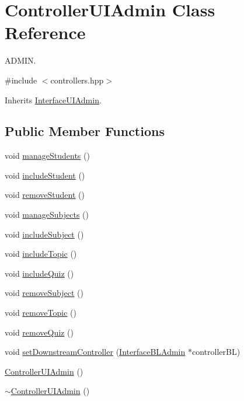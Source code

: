 \hypertarget{class_controller_u_i_admin}{}\section{Controller\+U\+I\+Admin Class Reference}
\label{class_controller_u_i_admin}


A\+D\+M\+IN.  




{\ttfamily \#include $<$controllers.\+hpp$>$}



Inherits \hyperlink{class_interface_u_i_admin}{Interface\+U\+I\+Admin}.

\subsection*{Public Member Functions}
\begin{DoxyCompactItemize}
\item 
void \hyperlink{class_controller_u_i_admin_ad77ca0f143bc938b48198d91b1be031b}{manage\+Students} ()
\item 
void \hyperlink{class_controller_u_i_admin_abe57cd3860f99ae9ee0023bdb9ccd6b1}{include\+Student} ()
\item 
void \hyperlink{class_controller_u_i_admin_a4487c7bf31acf5637e15e62af131b550}{remove\+Student} ()
\item 
void \hyperlink{class_controller_u_i_admin_a1e09e8b10c0f2261e307d9e9023daaa4}{manage\+Subjects} ()
\item 
void \hyperlink{class_controller_u_i_admin_a7c31484c26788da7ea3d551bbf9f82f8}{include\+Subject} ()
\item 
void \hyperlink{class_controller_u_i_admin_adb83b8e77cde718af7571e4d256b6b63}{include\+Topic} ()
\item 
void \hyperlink{class_controller_u_i_admin_a9867df3728ad7e8c663a3b999e96a441}{include\+Quiz} ()
\item 
void \hyperlink{class_controller_u_i_admin_a7799d896fb475d2731843c6a67db3390}{remove\+Subject} ()
\item 
void \hyperlink{class_controller_u_i_admin_aad9b0c9e945e3075bb8eb25b55378f27}{remove\+Topic} ()
\item 
void \hyperlink{class_controller_u_i_admin_aeb774e2a137c65593cbe4c3ed22ffe64}{remove\+Quiz} ()
\item 
void \hyperlink{class_controller_u_i_admin_aad33fe10f31f698f1bf0343aa5b2b7ec}{set\+Downstream\+Controller} (\hyperlink{class_interface_b_l_admin}{Interface\+B\+L\+Admin} $\ast$controller\+BL)
\item 
\hyperlink{class_controller_u_i_admin_a53eae99487a6aadfb303aaacc3c975eb}{Controller\+U\+I\+Admin} ()
\item 
\hyperlink{class_controller_u_i_admin_aaaeea4ce8d4e357a4121b7c59a0e1288}{$\sim$\+Controller\+U\+I\+Admin} ()
\end{DoxyCompactItemize}


